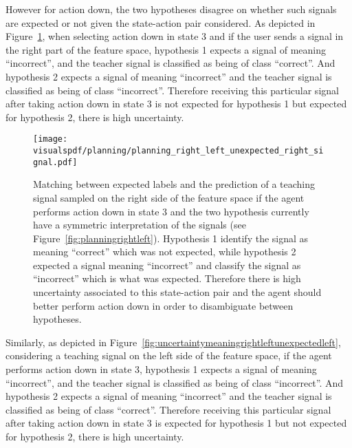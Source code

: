 \newpage

However for action down, the two hypotheses disagree on whether such signals are expected or not given the state-action pair considered. As depicted in Figure~\ref{fig:uncertaintymeaningrightleftunexpectedright}, when selecting action down in state 3 and if the user sends a signal in the right part of the feature space, hypothesis 1 expects a signal of meaning ``incorrect'', and the teacher signal is classified as being of class ``correct''. And hypothesis 2 expects a signal of meaning ``incorrect'' and the teacher signal is classified as being of class ``incorrect''. Therefore receiving this particular signal after taking action down in state 3 is not expected for hypothesis 1 but expected for hypothesis 2, there is high uncertainty.

\begin{figure}[H]
  \centering
  \texttt{[image: \\visualspdf/planning/planning\_right\_left\_unexpected\_right\_signal.pdf]}
  \caption{Matching between expected labels and the prediction of a teaching signal sampled on the right side of the feature space if the agent performs action down in state 3 and the two hypothesis currently have a symmetric interpretation of the signals (see Figure~\ref{fig:planningrightleft}). Hypothesis 1 identify the signal as meaning ``correct'' which was not expected, while hypothesis 2 expected a signal meaning ``incorrect'' and classify the signal as ``incorrect'' which is what was expected. Therefore there is high uncertainty associated to this state-action pair and the agent should better perform action down in order to disambiguate between hypotheses. }
  \label{fig:uncertaintymeaningrightleftunexpectedright}
\end{figure}

\newpage

Similarly, as depicted in Figure~\ref{fig:uncertaintymeaningrightleftunexpectedleft}, considering a teaching signal on the left side of the feature space, if the agent performs action down in state 3, hypothesis 1 expects a signal of meaning ``incorrect'', and the teacher signal is classified as being of class ``incorrect''. And hypothesis 2 expects a signal of meaning ``incorrect'' and the teacher signal is classified as being of class ``correct''. Therefore receiving this particular signal after taking action down in state 3 is expected for hypothesis 1 but not expected for hypothesis 2, there is high uncertainty.

